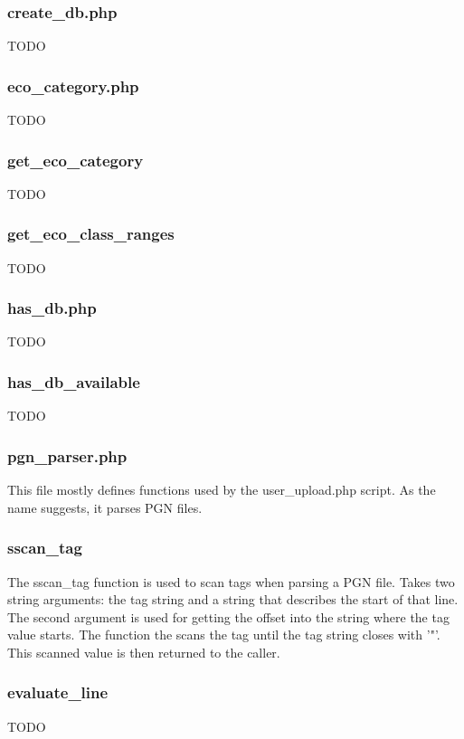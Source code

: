 \documentclass{article}
\begin{document}
\subsubsection{create\_db.php}
TODO

\subsubsection{eco\_category.php}
TODO

\subsubsection*{get\_eco\_category}
TODO

\subsubsection*{get\_eco\_class\_ranges}
TODO

\subsubsection{has\_db.php}
TODO

\subsubsection*{has\_db\_available}
TODO

\subsubsection{pgn\_parser.php}
This file mostly defines functions used by the user\_upload.php script.  As the name suggests, it parses PGN files.



\subsubsection*{sscan\_tag}
The sscan\_tag function is used to scan tags when parsing a PGN file. Takes two string arguments:  the tag string and a string that describes the start of that line.  The second argument is used for getting the offset into the string where the tag value starts.  The function the scans the tag until the tag string closes with '"'.  This scanned value is then returned to the caller.

\subsubsection*{evaluate\_line}
TODO
\end{document}
